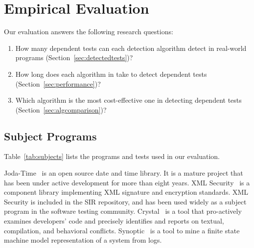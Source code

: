 \section{Empirical Evaluation}
\label{sec:evaluation}



\newcommand{\jodatimetests}{3875\xspace}
\newcommand{\xmlsecuritytests}{108\xspace}
\newcommand{\crystaltests}{75\xspace}
\newcommand{\synoptictests}{118\xspace}
\newcommand{\totaltests}{4176\xspace}

\newcommand{\jodatimeautotests}{2639\xspace}
\newcommand{\xmlsecurityautotests}{665\xspace}
\newcommand{\crystalautotests}{3198\xspace}
\newcommand{\synopticautotests}{2467\xspace}
\newcommand{\totalautotests}{8969\xspace}




Our evaluation answers the following research questions:

\vspace{-1mm}

\begin{enumerate}
\vspace{-1mm}
\item How many dependent tests can each detection
algorithm detect in
real-world programs (Section~\ref{sec:detectedtests})?

\item How long does each algorithm in \ourtool take to detect dependent
tests (Section~\ref{sec:performance})?

\item Which algorithm is the most cost-effective one in detecting
dependent tests (Section~\ref{sec:algcomparison})?
\end{enumerate}

\subsection{Subject Programs}


Table~\ref{tab:subjects} lists the programs and
tests used in our evaluation.

Joda-Time~\cite{jodatime} is an open source
date and time library. It is a mature project that
has been under active development
for more than eight years. XML Security~\cite{xmlsecurity}
is a component library implementing XML signature and encryption
standards. XML Security is included in
the SIR repository, and has been used widely
as a subject program in the software testing community.
Crystal~\cite{crystal} is a tool that
pro-actively examines developers' code and
precisely identifies and reports on textual,
compilation, and behavioral conflicts.
Synoptic~\cite{synoptic} is a tool to mine a finite state
machine model representation of a system from logs.

